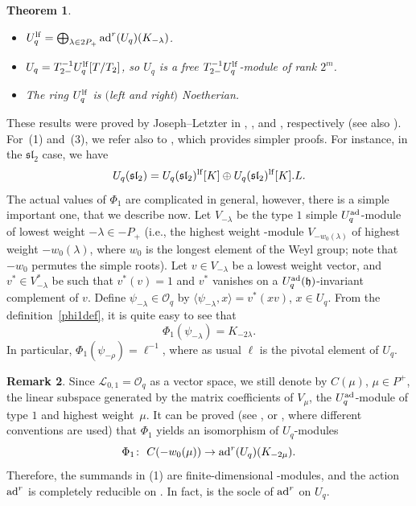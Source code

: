 \documentclass[pdftex]{sigma}
\numberwithin{equation}{section}
\newtheorem{teo}{Theorem}[section]
\theoremstyle{definition}
\newtheorem{Remark}[teo]{Remark}
\newcommand{\Ll}{{\mathcal L}}
\newcommand{\Oo}{{\mathcal O}}
\newcommand{\ra}{\rightarrow}
\begin{document}
\begin{teo} \label{JLteo1} \quad
\begin{itemize}\itemsep=0pt
\item[$(1)$] $U_q^{\rm lf} = \bigoplus_{\lambda \in 2P_+} {\rm ad}^r(U_q)(K_{-\lambda})$.
\item[$(2)$] $U_q = T_{2-}^{-1}U_q^{\rm lf}[T/T_{2}]$, so $U_q$ is a free $T_{2-}^{-1}U_q^{\rm lf}$-module of rank $2^m$.
\item[$(3)$] The ring $U_q^{\rm lf}$ is $($left and right$)$ Noetherian.
\end{itemize}
\end{teo}

These results were proved by Joseph--Letzter in \cite[Theorem~4.10]{JL2}, \cite[Theorem 6.4]{JL}, and \cite[Theorem~7.4.8]{Jos}, respectively (see also \cite[Sections~7.1.6, 7.1.13 and~7.1.25]{Jos}). For~(1) and~(3), we refer also to \cite[Theorems~3.113 and~3.137]{VY}, which provides simpler proofs. For instance, in the ${\mathfrak{sl}_2}$ case, we have
\[U_q({\mathfrak{sl}_2}) = U_q({\mathfrak{sl}_2})^{\rm lf}[K] \oplus U_q({\mathfrak{sl}_2})^{\rm lf}[K].L.\]
The actual values of $\Phi_1$ are complicated in general, however, there is a simple important one, that we describe now. Let $V_{-\lambda}$ be the type $1$ simple $U_q^{\rm ad}$-module of lowest weight $-\lambda\in -P_+$ (i.e., the highest weight -module $V_{-w_0(\lambda)}$ of highest weight $-w_0(\lambda)$, where $w_0$ is the longest element of the Weyl group; note that $-w_0$ permutes the simple roots). Let $v\in V_{-\lambda}$ be a lowest weight vector, and $v^*\in V_{-\lambda}^*$ be such that $v^*(v)=1$ and $v^*$ vanishes on a $U_q^{\rm ad}(\mathfrak{h})$-invariant complement of $v$. Define $\psi_{-\lambda}\in \Oo_q$ by $\langle \psi_{-\lambda},x\rangle = v^*(xv)$, $x\in U_q$. From the definition~\eqref{phi1def}, it is quite easy to see that
\begin{equation}\label{Phi1psi-}
\Phi_1(\psi_{-\lambda}) = K_{-2\lambda}.
\end{equation}
In particular, $\Phi_1(\psi_{-\rho}) = \ell^{-1}$, where as usual $\ell$ is the pivotal element of $U_q$.

\begin{Remark}\label{remsocle} Since $\Ll_{0,1}=\Oo_q$ as a vector space, we still denote by $C(\mu)$, $\mu\in P^+$, the linear subspace generated by the matrix coefficients of $V_\mu$, the $U_q^{\rm ad}$-module of type $1$ and highest weight~$\mu$. It can be proved (see \cite[Section~7.1.22]{Jos}, or \cite[p.~156]{VY}, where different conventions are used) that $\Phi_1$ yields an isomorphism of $U_q$-modules
\begin{equation}\label{restphi1}
\Phi_{1}\colon\ C(-w_0(\mu)) \ra {\rm ad}^r(U_q)(K_{-2\mu}).
\end{equation}
Therefore, the summands in (1) are finite-dimensional -modules, and the action ${\rm ad}^r$ is completely reducible on . In fact,  is the socle of ${\rm ad}^r$ on $U_q$.
\end{Remark}
\end{document}
